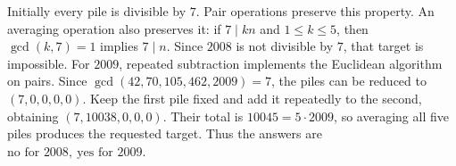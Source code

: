 Initially every pile is divisible by $7$. Pair operations preserve this property. An averaging operation also preserves it: if $7\mid kn$ and $1\le k\le5$, then $\gcd(k,7)=1$ implies $7\mid n$. Since $2008$ is not divisible by $7$, that target is impossible. For $2009$, repeated subtraction implements the Euclidean algorithm on pairs. Since $\gcd(42,70,105,462,2009)=7$, the piles can be reduced to $(7,0,0,0,0)$. Keep the first pile fixed and add it repeatedly to the second, obtaining $(7,10038,0,0,0)$. Their total is $10045=5\cdot2009$, so averaging all five piles produces the requested target. Thus the answers are $\boxed{\text{no for }2008,\ \text{yes for }2009}$.
